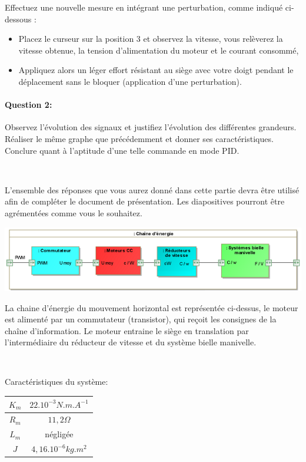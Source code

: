 Effectuez une nouvelle mesure en intégrant une perturbation, comme indiqué ci-dessous :
\begin{itemize}
 \item Placez le curseur sur la position 3 et observez la vitesse, vous relèverez la vitesse obtenue, la tension d'alimentation du moteur et le courant consommé,
 \item Appliquez alors un léger effort résistant au siège avec votre doigt pendant le déplacement sans le bloquer (application d'une perturbation).
\end{itemize}

\paragraph{Question 2:} Observez l'évolution des signaux et justifiez l'évolution des différentes grandeurs. Réaliser le même graphe que précédemment et donner ses caractéristiques. Conclure quant à l'aptitude d'une telle commande en mode PID.


~\

L'ensemble des réponses que vous aurez donné dans cette partie devra être utilisé afin de compléter le document de présentation. Les diapositives pourront être agrémentées comme vous le souhaitez.

\ifdef{\public}{\cleardoublepage}{\newpage}


\begin{center}
 \includegraphics[width=0.8\linewidth]{img/img2}
\end{center}

La chaine d'énergie du mouvement horizontal est représentée ci-dessus, le moteur est alimenté par un commutateur (transistor), qui reçoit les consignes de la chaîne d'information. Le moteur entraine le siège en translation par l'intermédiaire du réducteur de vitesse et du système bielle manivelle.

~\

Caractéristiques du système:
\begin{tabular}{|c|c|}
\hline
$K_m$ & $22.10^{-3}N.m.A^{-1}$ \\
\hline
$R_m$ & $11,2\Omega$ \\
\hline
$L_m$ & négligée \\
\hline
$J$ & $4,16.10^{-6}kg.m^2$ \\
\hline
\end{tabular}

